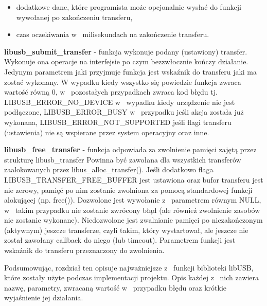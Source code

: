 \documentclass{BscUS}
\begin{document}
\begin{itemize}
{\begin{itemize}
\item dodatkowe dane, które programista może opcjonalnie wysłać do funkcji wywołanej po zakończeniu transferu,
\item czas oczekiwania w~ milisekundach na zakończenie transferu.
\end{itemize}
\item \textbf{libusb\_submit\_transfer} - funkcja wykonuje podany (ustawiony) transfer.
Wykonuje ona operacje na interfejsie po czym bezzwłocznie kończy działanie.
Jedynym parametrem jaki przyjmuje funkcja jest wskaźnik do transferu jaki ma zostać wykonany.
W wypadku kiedy wszystko się powiedzie funkcja zwraca wartość równą 0, w~ pozostałych przypadkach zwraca kod błędu tj. LIBUSB\_ERROR\_NO\_DEVICE w~ wypadku kiedy urządzenie nie jest podłączone, LIBUSB\_ERROR\_BUSY w~ przypadku jeśli akcja została już wykonana, LIBUSB\_ERROR\_NOT\_SUPPORTED jeśli flagi transferu (ustawienia) nie są wspierane przez system operacyjny oraz inne.
\item \textbf{libusb\_free\_transfer} - funkcja odpowiada za zwolnienie pamięci zajętą przez strukturę libusb\_transfer
Powinna być zawołana dla wszystkich transferów zaalokowanych przez libus\_alloc\_transfer().
Jeśli dodatkowo flaga LIBUSB\_TRANSFER\_FREE\_BUFFER jest ustawiona oraz bufor transferu jest nie zerowy, pamięć po nim zostanie zwolniona za pomocą standardowej funkcji alokującej (np. free()).
Dozwolone jest wywołanie z~ parametrem równym NULL, w~ takim przypadku nie zostanie zwrócony błąd (ale również zwolnienie zasobów nie zostanie wykonane).
Niedozwolone jest zwalnianie pamięci po niezakończonym (aktywnym) jeszcze transferze, czyli takim, który wystartował, ale jeszcze nie został zawołany callback do niego (lub timeout).
Parametrem funkcji jest wskaźnik do transferu przeznaczony do zwolnienia.
\newline
}
\end{itemize}
\indent \indent Podsumowując, rozdział ten opisuje najważniejsze z~ funkcji biblioteki libUSB, które zostały użyte podczas implementacji projektu. Opis każdej z~ nich zawiera nazwę, parametry, zwracaną wartość w~ przypadku błędu oraz krótkie wyjaśnienie jej działania.
\end{document}
